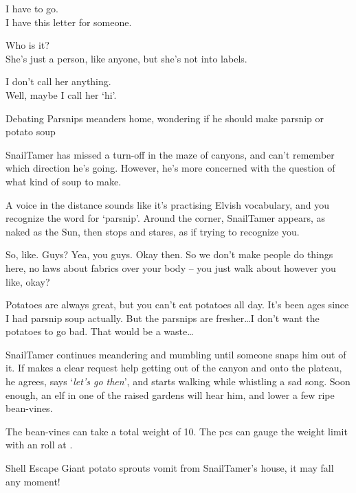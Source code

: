 \begin{speechtext}
  I have to go. \\
  I have this letter for someone.

  Who is it? \\
  She's just a person, like anyone, but she's not into labels.

  I don't call her anything. \\
  Well, maybe I call her `hi'.
\end{speechtext}


{Debating Parsnips}%
{ meanders home, wondering if he should make parsnip or potato soup}%

\Gls{SnailTamer} has missed a turn-off in the maze of canyons, and can't remember which direction he's going.
However, he's more concerned with the question of what kind of soup to make.

\begin{boxtext}
A voice in the distance sounds like it's practising Elvish vocabulary, and you recognize the word for `parsnip'.
Around the corner, \gls{SnailTamer} appears, as naked as the Sun, then stops and stares, as if trying to recognize you.
\end{boxtext}

\begin{speechtext}
  So, like.  Guys?  Yea, you guys.  Okay then.  So we don't make people do things here, no laws about fabrics over your body -- you just walk about however you like, okay?

  Potatoes are always great, but you can't eat potatoes all day.
  It's been ages since I had parsnip soup actually.
  But the parsnips are fresher\ldots I don't want the potatoes to go bad.
  That would be a waste\ldots
\end{speechtext}

\Gls{SnailTamer} continues meandering and mumbling until someone snaps him out of it.
If  makes a clear request help getting out of the canyon and onto the plateau, he agrees, says `\textit{let's go then}', and starts walking while whistling a sad song.
Soon enough, an elf in one of the raised gardens will hear him, and lower a few ripe bean-vines.

The bean-vines can take a total \gls{weight} of 10.
The \glspl{pc} can gauge the weight limit with an  roll at \tn[8].

{Shell Escape}%
{Giant potato sprouts vomit from \gls{SnailTamer}'s house, it may fall any moment!}%

